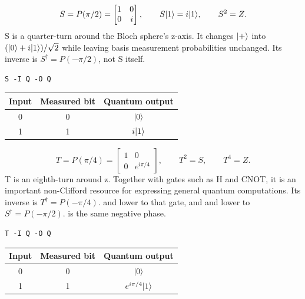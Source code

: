 
\[
S=P(\pi/2)=\begin{bmatrix}1&0\\0&i\end{bmatrix},\qquad
S\lvert 1\rangle=i\lvert 1\rangle,\qquad S^2=Z.
\]
S is a quarter-turn around the Bloch sphere's z-axis. It changes $\lvert +\rangle$ into
$(\lvert 0\rangle+i\lvert 1\rangle)/\sqrt2$ while leaving basis measurement probabilities
unchanged. Its inverse is $S^\dagger=P(-\pi/2)$, not S itself.
\begin{lstlisting}
S -I Q -O Q
\end{lstlisting}
\begin{center}
\begin{tabular}{ccc}\toprule Input & Measured bit & Quantum output\\\midrule
0 & 0 & $\lvert 0\rangle$\\
1 & 1 & $i\lvert 1\rangle$\\\bottomrule\end{tabular}
\end{center}


\[
T=P(\pi/4)=\begin{bmatrix}1&0\\0&e^{i\pi/4}\end{bmatrix},\qquad
T^2=S,\qquad T^4=Z.
\]
T is an eighth-turn around z. Together with gates such as H and CNOT, it is an
important non-Clifford resource for expressing general quantum computations.
Its inverse is $T^\dagger=P(-\pi/4)$.  and  lower to that
gate, and  and  lower to $S^\dagger=P(-\pi/2)$.
 is the same negative phase.
\begin{lstlisting}
T -I Q -O Q
\end{lstlisting}
\begin{center}
\begin{tabular}{ccc}\toprule Input & Measured bit & Quantum output\\\midrule
0 & 0 & $\lvert 0\rangle$\\
1 & 1 & $e^{i\pi/4}\lvert 1\rangle$\\\bottomrule\end{tabular}
\end{center}


